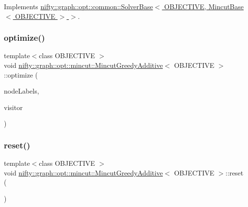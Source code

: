 Implements \hyperlink{classnifty_1_1graph_1_1opt_1_1common_1_1SolverBase_a55e9eb645c07d6e0782ebfb990ab3c84}{nifty\+::graph\+::opt\+::common\+::\+Solver\+Base$<$ O\+B\+J\+E\+C\+T\+I\+V\+E, Mincut\+Base$<$ O\+B\+J\+E\+C\+T\+I\+V\+E $>$ $>$}.

\mbox{\label{classnifty_1_1graph_1_1opt_1_1mincut_1_1MincutGreedyAdditive_a37d99b0e539ca6150d7ba6a713d937c5}} 
\subsubsection{\texorpdfstring{optimize()}{optimize()}}
{\footnotesize\ttfamily template$<$class O\+B\+J\+E\+C\+T\+I\+VE $>$ \\
void \hyperlink{classnifty_1_1graph_1_1opt_1_1mincut_1_1MincutGreedyAdditive}{nifty\+::graph\+::opt\+::mincut\+::\+Mincut\+Greedy\+Additive}$<$ O\+B\+J\+E\+C\+T\+I\+VE $>$\+::optimize (\begin{DoxyParamCaption}\item[{\hyperlink{classnifty_1_1graph_1_1opt_1_1mincut_1_1MincutGreedyAdditive_a5a8855589a1e752e63650d8e678fc162}{Node\+Labels\+Type} \&}]{node\+Labels,  }\item[{\hyperlink{classnifty_1_1graph_1_1opt_1_1mincut_1_1MincutGreedyAdditive_a6754295908ae1d3f3ce8a98999bff99d}{Visitor\+Base\+Type} $\ast$}]{visitor }\end{DoxyParamCaption})\hspace{0.3cm}{\ttfamily [virtual]}}

\mbox{\label{classnifty_1_1graph_1_1opt_1_1mincut_1_1MincutGreedyAdditive_ad22ac997a0041491747fe5e13b500fed}} 
\subsubsection{\texorpdfstring{reset()}{reset()}}
{\footnotesize\ttfamily template$<$class O\+B\+J\+E\+C\+T\+I\+VE $>$ \\
void \hyperlink{classnifty_1_1graph_1_1opt_1_1mincut_1_1MincutGreedyAdditive}{nifty\+::graph\+::opt\+::mincut\+::\+Mincut\+Greedy\+Additive}$<$ O\+B\+J\+E\+C\+T\+I\+VE $>$\+::reset (\begin{DoxyParamCaption}{ }\end{DoxyParamCaption})}

